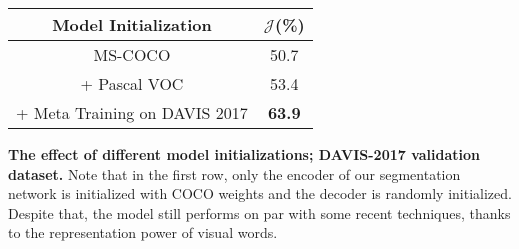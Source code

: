 \documentclass[10pt,twocolumn,letterpaper]{article}
\begin{document}
    \centering
    \small
    \begin{tabular}{cc}
    \hline
    Model Initialization                  & $\mathcal{J}${\footnotesize (\%)} \\ \hline
    MS-COCO                & 50.7\\
    + Pascal VOC    & 53.4\\
    + Meta Training on DAVIS 2017      & {\bf 63.9}\\
    \hline
    \end{tabular}
    \caption{{\bf The effect of different model initializations; DAVIS-2017 validation dataset.} Note that in the first row, only the encoder of our segmentation network is initialized with COCO weights and the decoder is randomly initialized. Despite that, the model still performs on par with some recent techniques, thanks to the representation power of visual words.}
    \label{tab:ablation_training}
\end{document}
